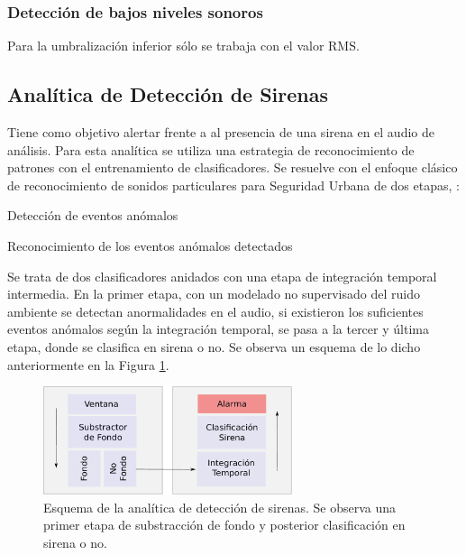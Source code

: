 \documentclass{article}
\begin{document}
\subsubsection{Detección de bajos niveles sonoros}
Para la umbralización inferior sólo se trabaja con el valor RMS.

\subsection{Analítica de Detección de Sirenas}
\label{deteccion de sirenas}
Tiene como objetivo alertar frente a al presencia de una sirena en el audio de análisis. Para esta analítica se utiliza una estrategia de reconocimiento de patrones con el entrenamiento de clasificadores. Se resuelve con el enfoque clásico de reconocimiento de sonidos particulares para Seguridad Urbana de dos etapas, \cite{lecomte2011abnormal}:
\begin{enumerate}
\begin{item}
Detección de eventos anómalos
\end{item}
\begin{item}
Reconocimiento de los eventos anómalos detectados
\end{item}
\end{enumerate}

Se trata de dos clasificadores anidados con una etapa de integración temporal intermedia. En la primer etapa, con un modelado no supervisado del ruido ambiente se detectan anormalidades en el audio, si existieron los suficientes eventos anómalos según la integración temporal, se pasa a la tercer y última etapa, donde se clasifica en sirena o no. Se observa un esquema de lo dicho anteriormente en la Figura \ref{fig:deteccion_sirenas}. 
 
\begin{figure}[h]
\begin{center}
\includegraphics[width=0.65\textwidth]{deteccion_sirenas} 
\caption{Esquema de la analítica de detección de sirenas. Se observa una primer etapa de substracción de fondo y posterior clasificación en sirena o no.}
\label{fig:deteccion_sirenas}
\end{center}
\end{figure}
\end{document}

